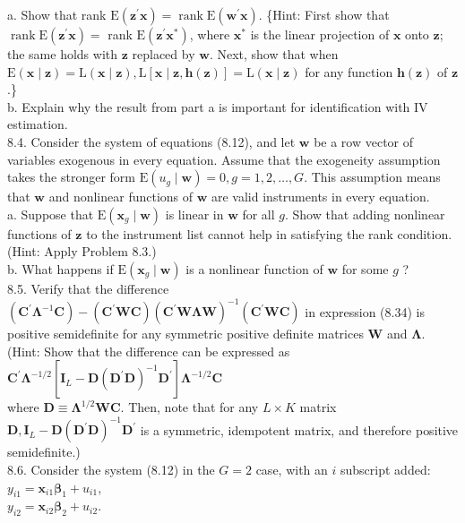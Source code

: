 \documentclass[10pt]{article}
\begin{document}
a. Show that rank $\mathrm{E}\left(\mathbf{z}^{\prime} \mathbf{x}\right)=\operatorname{rank} \mathrm{E}\left(\mathbf{w}^{\prime} \mathbf{x}\right)$. \{Hint: First show that $\operatorname{rank} \mathrm{E}\left(\mathbf{z}^{\prime} \mathbf{x}\right)=$ rank $\mathrm{E}\left(\mathbf{z}^{\prime} \mathbf{x}^{*}\right)$, where $\mathbf{x}^{*}$ is the linear projection of $\mathbf{x}$ onto $\mathbf{z}$; the same holds with $\mathbf{z}$ replaced by $\mathbf{w}$. Next, show that when $\mathrm{E}(\mathbf{x} \mid \mathbf{z})=\mathrm{L}(\mathbf{x} \mid \mathbf{z}), \mathrm{L}[\mathbf{x} \mid \mathbf{z}, \mathbf{h}(\mathbf{z})]=\mathrm{L}(\mathbf{x} \mid \mathbf{z})$ for any function $\mathbf{h}(\mathbf{z})$ of $\mathbf{z}$.\}\\
b. Explain why the result from part a is important for identification with IV estimation.\\
8.4. Consider the system of equations (8.12), and let $\mathbf{w}$ be a row vector of variables exogenous in every equation. Assume that the exogeneity assumption takes the stronger form $\mathrm{E}\left(u_{g} \mid \mathbf{w}\right)=0, g=1,2, \ldots, G$. This assumption means that $\mathbf{w}$ and nonlinear functions of $\mathbf{w}$ are valid instruments in every equation.\\
a. Suppose that $\mathrm{E}\left(\mathbf{x}_{g} \mid \mathbf{w}\right)$ is linear in $\mathbf{w}$ for all $g$. Show that adding nonlinear functions of $\mathbf{z}$ to the instrument list cannot help in satisfying the rank condition. (Hint: Apply Problem 8.3.)\\
b. What happens if $\mathrm{E}\left(\mathbf{x}_{g} \mid \mathbf{w}\right)$ is a nonlinear function of $\mathbf{w}$ for some $g$ ?\\
8.5. Verify that the difference $\left(\mathbf{C}^{\prime} \boldsymbol{\Lambda}^{-1} \mathbf{C}\right)-\left(\mathbf{C}^{\prime} \mathbf{W} \mathbf{C}\right)\left(\mathbf{C}^{\prime} \mathbf{W} \boldsymbol{\Lambda} \mathbf{W}\right)^{-1}\left(\mathbf{C}^{\prime} \mathbf{W C}\right)$ in expression (8.34) is positive semidefinite for any symmetric positive definite matrices $\mathbf{W}$ and $\boldsymbol{\Lambda}$. (Hint: Show that the difference can be expressed as\\
$\mathbf{C}^{\prime} \boldsymbol{\Lambda}^{-1 / 2}\left[\mathbf{I}_{L}-\mathbf{D}\left(\mathbf{D}^{\prime} \mathbf{D}\right)^{-1} \mathbf{D}^{\prime}\right] \boldsymbol{\Lambda}^{-1 / 2} \mathbf{C}$\\
where $\mathbf{D} \equiv \boldsymbol{\Lambda}^{1 / 2} \mathbf{W C}$. Then, note that for any $L \times K$ matrix $\mathbf{D}, \mathbf{I}_{L}-\mathbf{D}\left(\mathbf{D}^{\prime} \mathbf{D}\right)^{-1} \mathbf{D}^{\prime}$ is a symmetric, idempotent matrix, and therefore positive semidefinite.)\\
8.6. Consider the system (8.12) in the $G=2$ case, with an $i$ subscript added:\\
$y_{i 1}=\mathbf{x}_{i 1} \boldsymbol{\beta}_{1}+u_{i 1}$,\\
$y_{i 2}=\mathbf{x}_{i 2} \boldsymbol{\beta}_{2}+u_{i 2}$.
\end{document}
